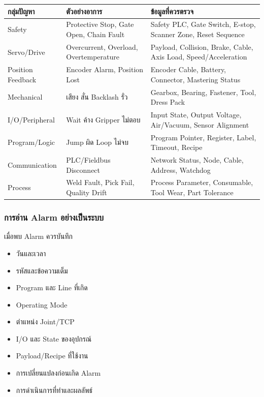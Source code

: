 \begin{table}[htbp]
    \centering
    \small
    \begin{tabularx}{\textwidth}{@{}L{0.20\textwidth}L{0.30\textwidth}Y@{}}
        \hline
        \textbf{กลุ่มปัญหา} & \textbf{ตัวอย่างอาการ} & \textbf{ข้อมูลที่ควรตรวจ} \\
        \hline
        Safety & Protective Stop, Gate Open, Chain Fault & Safety PLC, Gate Switch, E-stop, Scanner Zone, Reset Sequence \\
        Servo/Drive & Overcurrent, Overload, Overtemperature & Payload, Collision, Brake, Cable, Axis Load, Speed/Acceleration \\
        Position Feedback & Encoder Alarm, Position Lost & Encoder Cable, Battery, Connector, Mastering Status \\
        Mechanical & เสียง สั่น Backlash รั่ว & Gearbox, Bearing, Fastener, Tool, Dress Pack \\
        I/O/Peripheral & Wait ค้าง Gripper ไม่ตอบ & Input State, Output Voltage, Air/Vacuum, Sensor Alignment \\
        Program/Logic & Jump ผิด Loop ไม่จบ & Program Pointer, Register, Label, Timeout, Recipe \\
        Communication & PLC/Fieldbus Disconnect & Network Status, Node, Cable, Address, Watchdog \\
        Process & Weld Fault, Pick Fail, Quality Drift & Process Parameter, Consumable, Tool Wear, Part Tolerance \\
        \hline
    \end{tabularx}
\end{table}

\subsubsection{การอ่าน Alarm อย่างเป็นระบบ}

เมื่อพบ Alarm ควรบันทึก

\begin{itemize}
    \item วันและเวลา
    \item รหัสและข้อความเต็ม
    \item Program และ Line ที่เกิด
    \item Operating Mode
    \item ตำแหน่ง Joint/TCP
    \item I/O และ State ของอุปกรณ์
    \item Payload/Recipe ที่ใช้งาน
    \item การเปลี่ยนแปลงก่อนเกิด Alarm
    \item การดำเนินการที่ทำและผลลัพธ์
\end{itemize}

